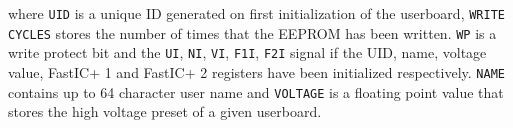 where \verb|UID| is a unique ID generated on first initialization of the userboard, \verb|WRITE CYCLES| stores the number of times that the EEPROM has been written. \verb|WP| is a write protect bit and the \verb|UI|, \verb|NI|, \verb|VI|, \verb|F1I|, \verb|F2I| signal if the UID, name, voltage value, FastIC+ 1 and FastIC+ 2 registers have been initialized respectively. \verb|NAME| contains up to 64 character user name and \verb|VOLTAGE| is a floating point value that stores the high voltage preset of a given userboard.

